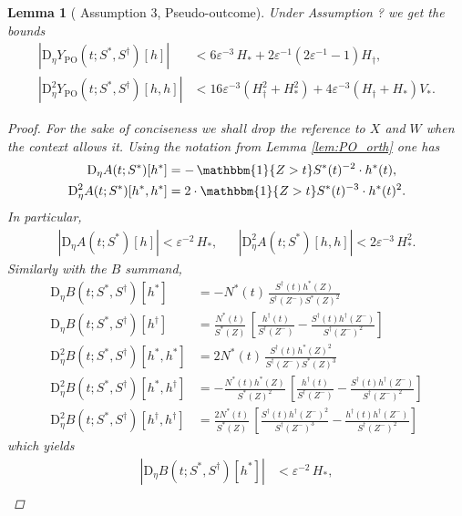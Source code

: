 \documentclass{article}
\newtheorem{lemma}[theorem]{Lemma}
\DeclareMathOperator{\IDF}{\mathbbm{1}}%
\newcommand{\YPO}{Y_{\mathrm{PO}}}
\newcommand{\bD}{\mathrm{D}}
\begin{document}
\begin{lemma}[\citet{foster2023orthogonal} Assumption 3, Pseudo-outcome] \label{lem:ass3_PO}
Under Assumption ? %
we get the bounds 
\begin{align*}
|\bD_\eta \YPO(t;S^*, S^\dagger)[h]| &< 
6\varepsilon^{-3}\,H_\ast + 2 \varepsilon^{-1}(2\varepsilon^{-1}-1)H_\dagger,\\
|\bD_\eta^2 \YPO(t;S^*, S^\dagger)[h,h]| &< 
16 \varepsilon^{-3}(H_\dagger^{2} + H_\ast^{2}) + 4\varepsilon^{-3}(H_\dagger + H_\ast)V_\ast.
\end{align*}
\begin{proof}
For the sake of conciseness we shall drop the reference to $X$ and $W$ when the context allows it. Using the notation from Lemma \ref{lem:PO_orth} one has
\begin{align*}
\bD_\eta A(t;S^*)[h^*] &= - \IDF\{Z>t\} S^*(t)^{-2} \cdot h^*(t),\\ 
\bD_\eta^2 A(t;S^*)[h^*,h^*] &= 2 \cdot \IDF\{Z>t\} S^*(t)^{-3} \cdot h^*(t)^2. 
\end{align*}
In particular,
\begin{align*}
|\bD_\eta A(t;S^*)[h]| < \varepsilon^{-2}\,H_\ast, && 
|\bD_\eta^2 A(t;S^*)[h,h]| <  2 \varepsilon^{-3}\,H_\ast^2. 
\end{align*}
Similarly with the $B$ summand,
\begin{align*}
\bD_\eta B(t;S^*, S^\dagger)[h^*] &= 
- N^*(t)\,\frac{S^\dagger(t) h^*(Z)}{S^\dagger(Z^-) S^*(Z)^{2}}  \\
\bD_\eta B(t;S^*,S^\dagger)[h^\dagger] &=  
\frac{N^*(t)}{S^*(Z)} \, \left[ \frac{h^\dagger(t)}{S^\dagger(Z^-)} 
- \frac{S^\dagger(t)h^\dagger(Z^-)}{S^\dagger(Z^-)^2} \right] \\
\bD_\eta^2 B(t;S^*, S^\dagger)[h^*,h^*] &= 
2 N^*(t)\,\frac{S^\dagger(t) h^\ast(Z)^2}{S^\dagger(Z^-) S^\ast(Z)^{3}}\\
\bD_\eta^2 B(t;S^*, S^\dagger)[h^*, h^\dagger] &= 
- \frac{N^*(t) h^*(Z)}{S^*(Z)^{2}} \, \left[ \frac{h^\dagger(t)}{S^\dagger(Z^-)} 
- \frac{S^\dagger(t) h^\dagger(Z^-)}{S^\dagger(Z^-)^2} \right]\\
\bD_\eta^2 B(t;S^*,S^\dagger)[h^\dagger, h^\dagger] &=  
\frac{2N^*(t)}{S^*(Z)} \,  \left[ \frac{S^\dagger(t)h^\dagger(Z^-)^2}{S^\dagger(Z^-)^3}
- \frac{h^\dagger(t) h^\dagger(Z^-)}{S^\dagger(Z^-)^2} \right]
\end{align*}
which yields
\begin{align*}
|\bD_\eta B(t;S^*, S^\dagger)[h^*]| &< \varepsilon^{-2}\, H_\ast, \\ 

\end{align*}
\end{proof}
\end{lemma}
\end{document}
